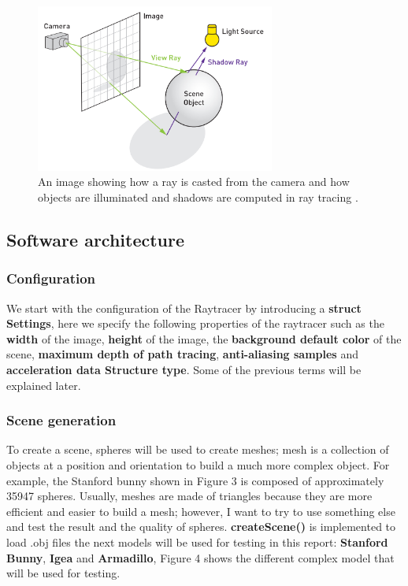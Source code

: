 \documentclass[11pt,a4paper]{article}
\begin{document}
	 	 	
	 \begin{figure}[H]	
	 	\begin{center}
	 		\includegraphics[width=0.7\textwidth]{4.png}
	 		
	 		\caption{ An image showing how a ray is casted from the camera and how objects are illuminated and shadows are computed in ray tracing	.} %
	 		\label{fig:1}
	 	\end{center}
	 \end{figure}
 
	\subsection{Software architecture}
	\subsubsection*{Configuration}
	We start with the configuration of the Raytracer by introducing a \textbf{struct Settings}, here we specify the following properties of the raytracer such as the \textbf{width} of the image, \textbf{height} of the image, the \textbf{background default color} of the scene, \textbf{maximum depth of path tracing},  \textbf{anti-aliasing samples} and \textbf{acceleration data Structure type}. Some of the previous terms will be explained later. 


	\subsubsection*{Scene generation}
	To create a scene, spheres will be used to create meshes; mesh is a collection of objects at a position and orientation to build a much more complex object. For example, the Stanford bunny shown in Figure 3 is composed of approximately 35947 spheres. Usually, meshes are made of triangles because they are more efficient and easier to build a mesh; however, I want to try to use something else and test the result and the quality of spheres. \textbf{createScene()} is implemented to load .obj files the next models will be used for testing in this report: \textbf{Stanford Bunny}, \textbf{Igea} and \textbf{Armadillo}, Figure 4 shows the different complex model that will be used for testing.
\end{document}
